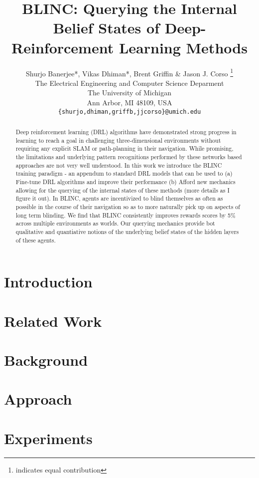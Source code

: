 \documentclass{article} %
\title{BLINC: Querying the Internal Belief States of Deep-Reinforcement Learning Methods}
\author{Shurjo Banerjee*, Vikas Dhiman*, Brent Griffin \& Jason J. Corso \thanks{indicates equal contribution} \\
The Electrical Engineering and Computer Science Deparment\\
The University of Michigan\\
Ann Arbor, MI 48109, USA \\
\texttt{\{shurjo,dhiman,griffb,jjcorso\}@umich.edu} \\
}
\begin{document}
\maketitle

\begin{abstract}
    Deep reinforcement learning (DRL) algorithms have demonstrated strong progress in learning to reach a goal in challenging three-dimensional environments without requiring any explicit SLAM or path-planning in their navigation. While promising, the limitations and underlying pattern recognitions performed by these networks based approaches are not very well understood. In this work we introduce the BLINC training paradigm - an appendum to standard DRL models that can be used to (a) Fine-tune DRL algorithms and improve their performance (b) Afford new mechanics allowing for the querying of the internal states of these methods (more details as I figure it out). In BLINC, agents are incentivized to blind themselves as often as possible in the course of their navigation so as to more naturally pick up on aspects of long term blinding. We find that BLINC consistently improves rewards scores by 5\% across multiple environments as worlds. Our querying mechanics provide bot qualitative and quantiative notions of the underlying belief states of the hidden layers of these agents. 

\end{abstract}

\section{Introduction}


\section{Related Work}


\section{Background}


\section{Approach}


\section{Experiments}

\end{document}
